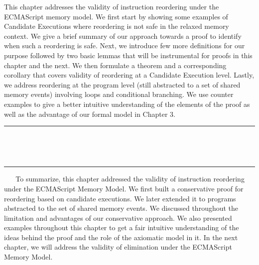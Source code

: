 This chapter addresses the validity of instruction reordering under the ECMAScript memory model.
We first start by showing some examples of Candidate Executions where reordering is not safe in the relaxed memory context.  
We give a brief summary of our approach towards a proof to identify when such a reordering is safe.
Next, we introduce few more definitions for our purpose followed by two basic lemmas that will be instrumental for proofs in this chapter and the next. 
We then formulate a theorem and a corresponding corollary that covers validity of reordering at a Candidate Execution level. 
Lastly, we address reordering at the program level (still abstracted to a set of shared memory events) involving loops and conditional branching.
We use counter examples to give a better intuitive understanding of the elements of the proof as well as the advantage of our formal model in Chapter 3.
\ \newline
\ \newline  
\hrule 
\ \newline 
\ \newline 













\ \newline
\ \newline  
\hrule 
\ \newline 
\ \newline 
To summarize, this chapter addressed the validity of instruction reordering under the ECMAScript Memory Model. 
We first built a conservative proof for reordering based on candidate executions.
We later extended it to programs abstracted to the set of shared memory events. 
We discussed throughout the limitation and advantages of our conservative approach. 
We also presented examples throughout this chapter to get a fair intuitive understanding of the ideas behind the proof and the role of the axiomatic model in it.
In the next chapter, we will address the validity of elimination under the ECMAScript Memory Model.